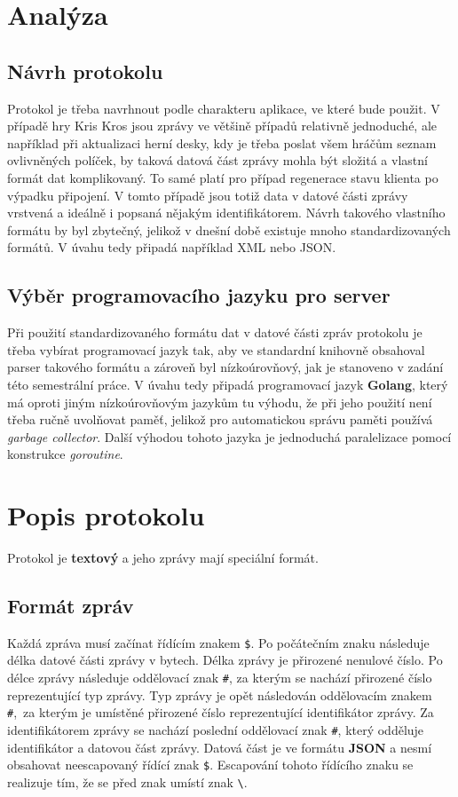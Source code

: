 \documentclass[12pt, a4paper]{article}
\let\oldsection\section
\renewcommand\section{\clearpage\oldsection}
\begin{document}
    \section{Analýza}
    \subsection{Návrh protokolu}
    	Protokol je třeba navrhnout podle charakteru aplikace, ve které bude použit. V případě hry Kris Kros jsou zprávy ve většině případů relativně jednoduché, ale například při aktualizaci herní desky, kdy je třeba poslat všem hráčům seznam ovlivněných políček, by taková datová část zprávy mohla být složitá a vlastní formát dat komplikovaný. To samé platí pro případ regenerace stavu klienta po výpadku připojení. V tomto případě jsou totiž data v datové části zprávy vrstvená a ideálně i popsaná nějakým identifikátorem. Návrh takového vlastního formátu by byl zbytečný, jelikož v dnešní době existuje mnoho standardizovaných formátů. V úvahu tedy připadá například XML nebo JSON.
    \subsection{Výběr programovacího jazyku pro server}
    Při použití standardizovaného formátu dat v datové části zpráv protokolu je třeba vybírat programovací jazyk tak, aby ve standardní knihovně obsahoval parser takového formátu a zároveň byl nízkoúrovňový, jak je stanoveno v zadání této semestrální práce. V úvahu tedy připadá programovací jazyk \textbf{Golang}, který má oproti jiným nízkoúrovňovým jazykům tu výhodu, že při jeho použití není třeba ručně uvolňovat paměť, jelikož pro automatickou správu paměti používá \textit{garbage collector}. Další výhodou tohoto jazyka je jednoduchá paralelizace pomocí konstrukce \textit{goroutine}.
   	    \section{Popis protokolu}
	    Protokol je \textbf{textový} a jeho zprávy mají speciální formát.
	    \subsection{Formát zpráv}
		Každá zpráva musí začínat řídícím znakem \texttt{\$}. Po počátečním znaku následuje délka datové části zprávy v bytech. Délka zprávy je přirozené nenulové číslo. Po délce zprávy následuje oddělovací znak \texttt{\#}, za kterým se nachází přirozené číslo reprezentující typ zprávy. Typ zprávy je opět následován oddělovacím znakem \texttt{\#},\ za kterým je umístěné přirozené číslo reprezentující identifikátor zprávy. Za identifikátorem zprávy se nachází poslední oddělovací znak \texttt{\#}, který odděluje identifikátor a datovou část zprávy. Datová část je ve formátu \textbf{JSON} a nesmí obsahovat neescapovaný řídící znak \texttt{\$}. Escapování tohoto řídícího znaku se realizuje tím, že se před znak umístí znak \texttt{\textbackslash}.
		
\end{document}
